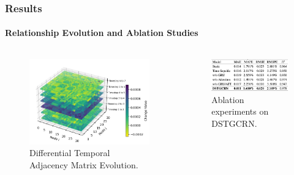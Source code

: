 \documentclass[light]{lutbeamer} %
\begin{document}
\begin{frame}
    \frametitle{Results}
    \framesubtitle{Relationship Evolution and Ablation Studies}

    \begin{columns} %

        \begin{column}{0.48\textwidth}
            \begin{figure}
                \centering
                \includegraphics[width=\textwidth]{figures/adj_heatmap_stack.png}
                \caption{Differential Temporal Adjacency Matrix Evolution.}
            \end{figure}
        \end{column}

        \begin{column}{0.48\textwidth}
            \begin{figure}
                \centering
                \includegraphics[width=\textwidth]{figures/dstgcrn_ablation.png}
                \caption{Ablation experiments on DSTGCRN.}
            \end{figure}
        \end{column}

    \end{columns}
\end{frame}
\end{document}
